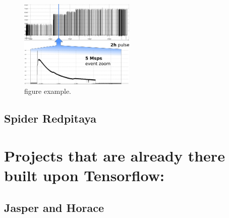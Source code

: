 \begin{figure}
\centering
\includegraphics[width=0.49\textwidth]{img/4_EmbeddedML/nio12b.png}
\caption{figure example.}
\label{fig:nio}
\end{figure}


\subsection{Spider Redpitaya}
\section{Projects that are already there built upon Tensorflow:}
\subsection{Jasper and Horace }
